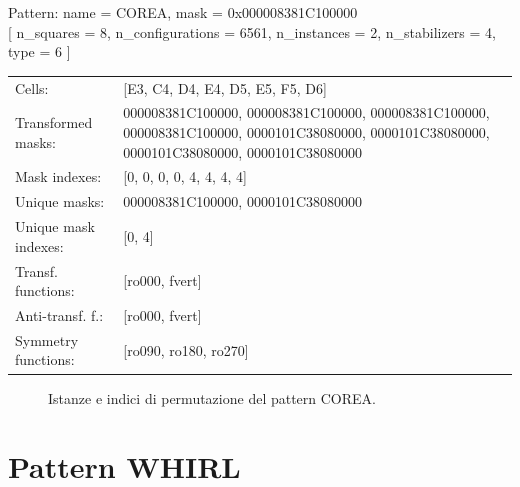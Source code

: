 \begin{tcolorbox}[sharp corners, fontupper=\ttfamily\small, colback=white]
  \noindent Pattern: name = COREA, mask = 0x000008381C100000\\
  {[} n\_squares = 8, n\_configurations = 6561,
  n\_instances = 2, n\_stabilizers = 4, type = 6 { ]}\\[1.0ex]
  \begin{tabularx}{\textwidth}{@{} p{3.5cm} X @{}}
    Cells:               & {[}E3, C4, D4, E4, D5, E5, F5, D6{]}\\[0.5ex]
    Transformed masks:   & 000008381C100000, 000008381C100000, 000008381C100000, 000008381C100000, 0000101C38080000, 0000101C38080000, 0000101C38080000, 0000101C38080000\\[0.5ex]
    Mask indexes:        & {[}0, 0, 0, 0, 4, 4, 4, 4{]}\\[0.5ex]
    Unique masks:        & 000008381C100000, 0000101C38080000\\[0.5ex]
    Unique mask indexes: & {[}0, 4{]}\\[0.5ex]
    Transf. functions:   & {[}ro000, fvert{]}\\[0.5ex]
    Anti-transf. f.:     & {[}ro000, fvert{]}\\[0.5ex]
    Symmetry functions:  & {[}ro090, ro180, ro270{]}\\[0.5ex]
  \end{tabularx}
\end{tcolorbox}

\begin{figure}[htbp]
  \centering
   \hfill
   \hfill
   \hfill
  \vspace{0.3cm}
   \hfill
   \hfill
   \hfill
  \caption{Istanze e indici di permutazione del pattern COREA.}
\end{figure}

\newpage

\section{Pattern WHIRL}

